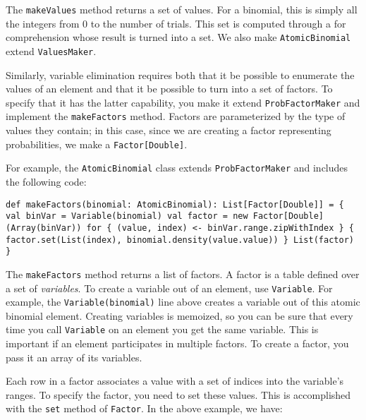 The \texttt{makeValues} method returns a set of values. For a binomial, this is simply all the integers from
0 to the number of trials. This set is computed through a for comprehension whose result is turned into a set. We also make \texttt{AtomicBinomial} extend \texttt{ValuesMaker}.

Similarly, variable elimination requires both that it be possible to enumerate the values of an element and that it be possible to turn into a set of factors. To specify that it has the latter capability, you make it
extend \texttt{ProbFactorMaker} and implement the \texttt{makeFactors} method. Factors are parameterized by the type of values they contain; in this case, since we are creating a factor representing probabilities, we make a \texttt{Factor[Double]}.

For example, the \texttt{AtomicBinomial} class extends \texttt{ProbFactorMaker} and includes the following code:

\begin{flushleft}
\texttt{def makeFactors(binomial: AtomicBinomial): List[Factor[Double]] = \{
\newline \tab val binVar = Variable(binomial)
\newline \tab val factor = new Factor[Double](Array(binVar))
\newline \tab for \{ (value, index) <- binVar.range.zipWithIndex \} \{
\newline \tab factor.set(List(index), binomial.density(value.value))
\newline \} 
\newline \tab List(factor)
\newline \}
}
\end{flushleft}

The \texttt{makeFactors} method returns a list of factors. A factor is a table defined over a set of \emph{variables}. To create a variable out of an element, use \texttt{Variable}. For example, the \texttt{Variable(binomial)} line above creates a variable out of this atomic binomial element. Creating variables is memoized, so you can be sure that every time you call \texttt{Variable} on an element you get the same variable. This is important if an element participates in multiple factors. To create a factor, you pass it an array of its variables.

Each row in a factor associates a value with a set of indices into the variable's ranges. To specify the factor, you need to set these values. This is accomplished with the \texttt{set} method of \texttt{Factor}. In the above example, we have:

